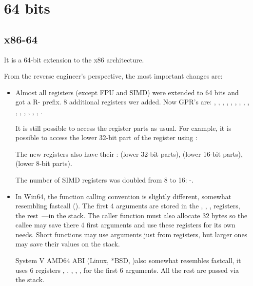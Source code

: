 \section{64 bits}

\subsection{x86-64}
\label{x86-64}

It is a 64-bit extension to the x86 architecture.

From the reverse engineer's perspective, the most important changes are:

\myindex{\CLanguageElements!\Pointers}
\begin{itemize}

\item

Almost all registers (except FPU and SIMD) were extended to 64 bits and got a R- prefix.
8 additional registers wer added.
Now \ac{GPR}'s are: \RAX, \RBX, \RCX, \RDX, 
\RBP, \RSP, \RSI, \RDI, , , , 
, , , , . 

It is still possible to access the  register parts as usual. 
For example, it is possible to access the lower 32-bit part of the \RAX register using \EAX:


The new  registers also have their :  (lower 32-bit parts),
 (lower 16-bit parts),  (lower 8-bit parts).


The number of SIMD registers was doubled from 8 to 16: -.

\item

In Win64, the function calling convention is slightly different, somewhat resembling fastcall
().
The first 4 arguments are stored in the \RCX, \RDX, ,  registers, the rest~---in the stack.
The \gls{caller} function must also allocate 32 bytes so the \gls{callee} may save there 4 first arguments and use these 
registers for its own needs.
Short functions may use arguments just from registers, but larger ones may save their values on the stack.

System V AMD64 ABI (Linux, *BSD, \MacOSX)\SysVABI also somewhat resembles
fastcall, it uses 6 registers 
\RDI, \RSI, \RDX, \RCX, ,  for the first 6 arguments.
All the rest are passed via the stack.


\end{itemize}
